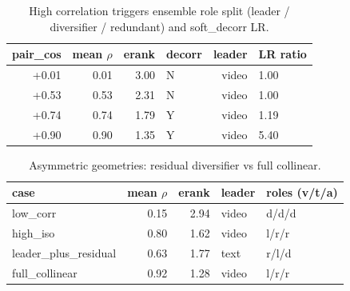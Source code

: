 \begin{table}[t]\centering
\caption{High correlation triggers ensemble role split (leader / diversifier / redundant) and soft\_decorr LR.}
\label{tab:agod-ensemble-decorr}
\begin{tabular}{rrrlrl}\toprule
pair\_cos & mean $\rho$ & erank & decorr & leader & LR ratio \\
\midrule
+0.01 & 0.01 & 3.00 & N & video & 1.00 \\
+0.53 & 0.53 & 2.31 & N & video & 1.00 \\
+0.74 & 0.74 & 1.79 & Y & video & 1.19 \\
+0.90 & 0.90 & 1.35 & Y & video & 5.40 \\
\bottomrule
\end{tabular}
\end{table}

\begin{table}[t]\centering
\caption{Asymmetric geometries: residual diversifier vs full collinear.}
\label{tab:agod-ensemble-decorr-asym}
\begin{tabular}{lrrll}\toprule
case & mean $\rho$ & erank & leader & roles (v/t/a) \\
\midrule
low\_corr & 0.15 & 2.94 & video & d/d/d \\
high\_iso & 0.80 & 1.62 & video & l/r/r \\
leader\_plus\_residual & 0.63 & 1.77 & text & r/l/d \\
full\_collinear & 0.92 & 1.28 & video & l/r/r \\
\bottomrule
\end{tabular}
\end{table}
